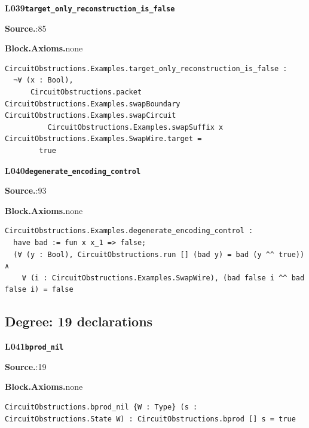 \par\medskip\noindent\begin{minipage}{\textwidth}
{\small\bfseries L039\enspace\texttt{target\_only\_reconstruction\_is\_false}\par}
{\footnotesize\raggedright\textbf{Source.}\enspace{}:85\par
\textbf{Block.}\quad\textbf{Axioms.}\enspace none\par}\nopagebreak
\begin{lstlisting}
CircuitObstructions.Examples.target_only_reconstruction_is_false :
  ¬∀ (x : Bool),
      CircuitObstructions.packet CircuitObstructions.Examples.swapBoundary CircuitObstructions.Examples.swapCircuit
          CircuitObstructions.Examples.swapSuffix x CircuitObstructions.Examples.SwapWire.target =
        true
\end{lstlisting}
\end{minipage}\par

\par\medskip\noindent\begin{minipage}{\textwidth}
{\small\bfseries L040\enspace\texttt{degenerate\_encoding\_control}\par}
{\footnotesize\raggedright\textbf{Source.}\enspace{}:93\par
\textbf{Block.}\quad\textbf{Axioms.}\enspace none\par}\nopagebreak
\begin{lstlisting}
CircuitObstructions.Examples.degenerate_encoding_control :
  have bad := fun x x_1 => false;
  (∀ (y : Bool), CircuitObstructions.run [] (bad y) = bad (y ^^ true)) ∧
    ∀ (i : CircuitObstructions.Examples.SwapWire), (bad false i ^^ bad false i) = false
\end{lstlisting}
\end{minipage}\par

\subsection*{Degree: 19 declarations}
\par\medskip\noindent\begin{minipage}{\textwidth}
{\small\bfseries L041\enspace\texttt{bprod\_nil}\par}
{\footnotesize\raggedright\textbf{Source.}\enspace{}:19\par
\textbf{Block.}\quad\textbf{Axioms.}\enspace none\par}\nopagebreak
\begin{lstlisting}
CircuitObstructions.bprod_nil {W : Type} (s : CircuitObstructions.State W) : CircuitObstructions.bprod [] s = true
\end{lstlisting}
\end{minipage}\par


